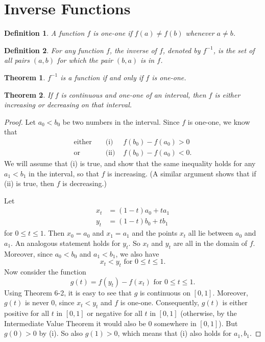 \documentclass{article}
\numberwithin{corollary}{subsection}
\newtheorem{definition}{Definition}
\numberwithin{definition}{subsection}
\numberwithin{lemma}{subsection}
\newtheorem{theorem}{Theorem}
\numberwithin{theorem}{subsection}
\begin{document}
\section{Inverse Functions}

\begin{definition}
  A function $f$ is \emph{one-one} if $f(a) \neq f(b)$ whenever $a \neq b$.
\end{definition}

\begin{definition}
  For any function $f$, the \emph{inverse} of $f$, denoted by $f^{-1}$, is the
  set of all pairs $(a, b)$ for which the pair $(b, a)$ is in $f$.
\end{definition}

\begin{theorem}
  $f^{-1}$ is a function if and only if $f$ is one-one.
\end{theorem}

\begin{theorem}
  If $f$ is continuous and one-one of an interval, then $f$ is either
  increasing or decreasing on that interval.
\end{theorem}
\begin{proof}
  Let $a_0 < b_0$ be two numbers in the interval. Since $f$ is one-one, we know
  that
  \begin{align*}
    \text{either} &&\text{ (i) } &f(b_0) - f(a_0) > 0 \\
    \text{or} &&\text{ (ii) } &f(b_0) - f(a_0) < 0.
  \end{align*}
  We will assume that (i) is true, and show that the same inequality holds for
  any $a_1 < b_1$ in the interval, so that $f$ is increasing. (A similar
  argument shows that if (ii) is true, then $f$ is decreasing.)

  Let
  \begin{align*}
    x_t &= (1 - t)a_0 + ta_1 \\
    y_t &= (1 - t)b_0 + tb_1
  \end{align*}
  for $0 \leq t \leq 1$. Then $x_0 = a_0$ and $x_1 = a_1$ and the points $x_t$
  all lie between $a_0$ and $a_1$. An analogous statement holds for $y_t$. So
  $x_t$ and $y_t$ are all in the domain of $f$. Moreover, since $a_0 < b_0$ and
  $a_1 < b_1$, we also have \[
    x_t < y_t \text{ for } 0 \leq t \leq 1.
  \] Now consider the function \[
    g(t) = f(y_t) - f(x_t) \text{ for } 0 \leq t \leq 1.
  \] Using Theorem 6-2, it is easy to see that $g$ is continuous on $[0, 1]$.
  Moreover, $g(t)$ is never 0, since $x_t < y_t$ and $f$ is one-one.
  Consequently, $g(t)$ is either positive for all $t$ in $[0, 1]$ or negative
  for all $t$ in $[0, 1]$ (otherwise, by the Intermediate Value Theorem it
  would also be 0 somewhere in $[0, 1]$). But $g(0) > 0$ by (i). So also $g(1)
  > 0$, which means that (i) also holds for $a_1, b_1$.
\end{proof}
\end{document}
